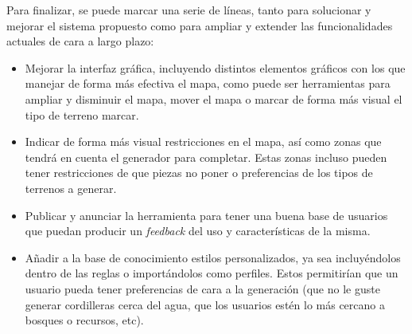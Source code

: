 Para finalizar, se puede marcar una serie de líneas, tanto para solucionar y mejorar el sistema propuesto como para ampliar y extender las funcionalidades actuales de cara a largo plazo:

\begin{itemize}
	\item Mejorar la interfaz gráfica, incluyendo distintos elementos gráficos con los que manejar de forma más efectiva el mapa, como puede ser herramientas para ampliar y disminuir el mapa, mover el mapa o marcar de forma más visual el tipo de terreno marcar.
	\item Indicar de forma más visual restricciones en el mapa, así como zonas que tendrá en cuenta el generador para completar. Estas zonas incluso pueden tener restricciones de que piezas no poner o preferencias de los tipos de terrenos a generar.
	\item Publicar y anunciar la herramienta para tener una buena base de usuarios que puedan producir un \textit{feedback} del uso y características de la misma.
	\item Añadir a la base de conocimiento estilos personalizados, ya sea incluyéndolos dentro de las reglas o importándolos como perfiles. Estos permitirían que un usuario pueda tener preferencias de cara a la generación (que no le guste generar cordilleras cerca del agua, que los usuarios estén lo más cercano a bosques o recursos, etc).
\end{itemize}